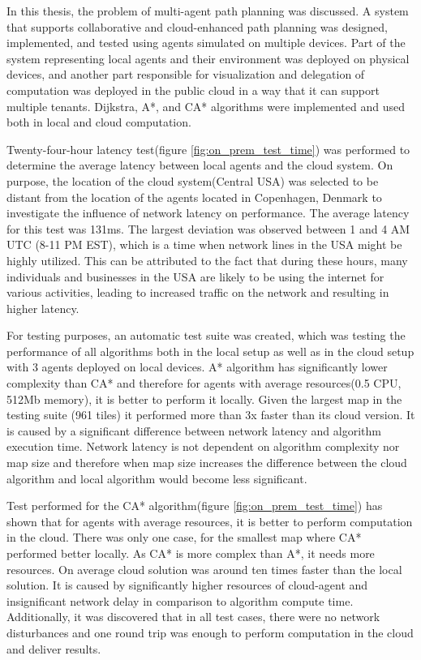 In this thesis, the problem of multi-agent path planning was discussed. A system that supports collaborative and cloud-enhanced path planning was designed, implemented, and tested using agents simulated on multiple devices. Part of the system representing local agents and their environment was deployed on physical devices, and another part responsible for visualization and delegation of computation was deployed in the public cloud in a way that it can support multiple tenants. Dijkstra, A*, and CA* algorithms were implemented and used both in local and cloud computation.

Twenty-four-hour latency test(figure \ref{fig:on_prem_test_time}) was performed to determine the average latency between local agents and the cloud system. On purpose, the location of the cloud system(Central USA) was selected to be distant from the location of the agents located in Copenhagen, Denmark to investigate the influence of network latency on performance. The average latency for this test was 131ms. The largest deviation was observed between 1 and 4 AM UTC (8-11 PM EST), which is a time when network lines in the USA might be highly utilized. This can be attributed to the fact that during these hours, many individuals and businesses in the USA are likely to be using the internet for various activities, leading to increased traffic on the network and resulting in higher latency. 

For testing purposes, an automatic test suite was created, which was testing the performance of all algorithms both in the local setup as well as in the cloud setup with 3 agents deployed on local devices. A* algorithm has significantly lower complexity  than CA* and therefore for agents with average resources(0.5 CPU, 512Mb memory), it is better to perform it locally. Given the largest map in the testing suite (961 tiles) it performed more than 3x faster than its cloud version. It is caused by a significant difference between network latency and algorithm execution time. Network latency is not dependent on algorithm complexity nor map size and therefore when map size increases the difference between the cloud algorithm and local algorithm would become less significant.

Test performed for the CA* algorithm(figure \ref{fig:on_prem_test_time}) has shown that for agents with average resources, it is better to perform computation in the cloud. There was only one case, for the smallest map where CA* performed better locally. As CA* is more complex than A*, it needs more resources. On average cloud solution was around ten times faster than the local solution. It is caused by significantly higher resources of cloud-agent and insignificant network delay in comparison to algorithm compute time. Additionally, it was discovered that in all test cases, there were no network disturbances and one round trip was enough to perform computation in the cloud and deliver results.

